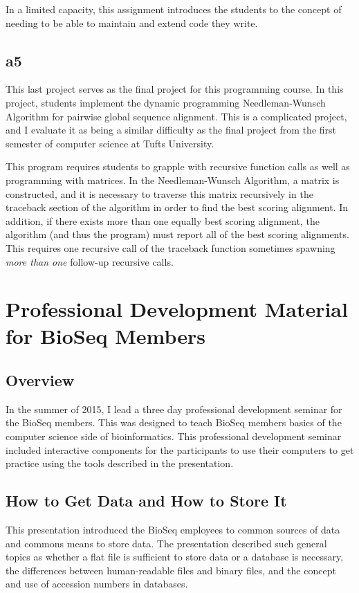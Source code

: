 \documentclass{report}
\begin{document}
In a limited capacity, this assignment introduces the students to the concept of needing to be able to maintain and extend code they write.

\subsection{a5}
This last project serves as the final project for this programming course. In this project, students implement the dynamic programming Needleman-Wunsch Algorithm for pairwise global sequence alignment. This is a complicated project, and I evaluate it as being a similar difficulty as the final project from the first semester of computer science at Tufts University.

This program requires students to grapple with recursive function calls as well as programming with matrices. In the Needleman-Wunsch Algorithm, a matrix is constructed, and it is necessary to traverse this matrix recursively in the traceback section of the algorithm in order to find the best scoring alignment. In addition, if there exists more than one equally best scoring alignment, the algorithm (and thus the program) must report all of the best scoring alignments. This requires one recursive call of the traceback function sometimes spawning \emph{more than one} follow-up recursive calls.


\section{Professional Development Material for BioSeq Members}
\subsection{Overview}
In the summer of 2015, I lead a three day professional development seminar for the BioSeq members. This was designed to teach BioSeq members basics of the computer science side of bioinformatics. This professional development seminar included interactive components for the participants to use their computers to get practice using the tools described in the presentation.

\subsection{How to Get Data and How to Store It}
This presentation introduced the BioSeq employees to common sources of data and commons means to store data. The presentation described such general topics as whether a flat file is sufficient to store data or a database is necessary, the differences between human-readable files and binary files, and the concept and use of accession numbers in databases.
\end{document}
